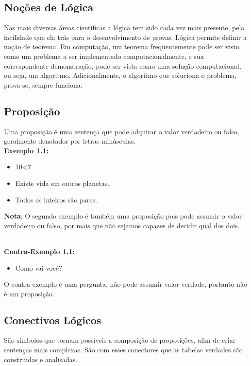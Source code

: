 \documentclass[a4paper,12pt,twoside,BCOR=10mm]{scrbook}
\begin{document}
\begin{titlepage}
\chapter{Noções de Lógica}
Nas mais diversas áreas científicas a lógica tem sido cada vez mais presente, pela facilidade que ela trás para o desenvolvimento de provas. Lógica permite definir a noção de teorema. Em computação, um teorema freqüentemente pode ser visto como um problema a ser implementado computacionalmente, e sua correspondente demonstração, pode ser vista como uma
solução computacional, ou seja, um algoritmo. Adicionalmente, o algoritmo que
soluciona o problema, prova-se, sempre funciona.

\section{Proposição}
Uma proposição é uma sentença que pode adquirar o valor verdadeiro ou falso, geralmente denotador por letras minúsculas.
\\
\textbf{Exemplo 1.1:}
\\	  
\begin{itemize}
\item 10<7
\item Existe vida em outros planetas.
\item Todos os inteiros são pares.
\end{itemize}

\textbf{Nota}: O segundo exemplo é também uma proposição pois pode assumir o valor verdadeiro ou falso, por mais que não sejamos capazes de decidir qual dos dois.

\\
\textbf{Contra-Exemplo 1.1:} 
\\	  
\begin{itemize}
\item Como vai você?
\end{itemize}
O contra-exemplo é uma pergunta, não pode assumir valor-verdade, portanto não é um proposição.

\section{Conectivos Lógicos}
São símbolos que tornam possíveis a composição de proposições, afim de criar sentenças mais complexas. São com esses conectores que as tabelas verdades são construidas e analisadas.

\end{titlepage}
\end{document}
